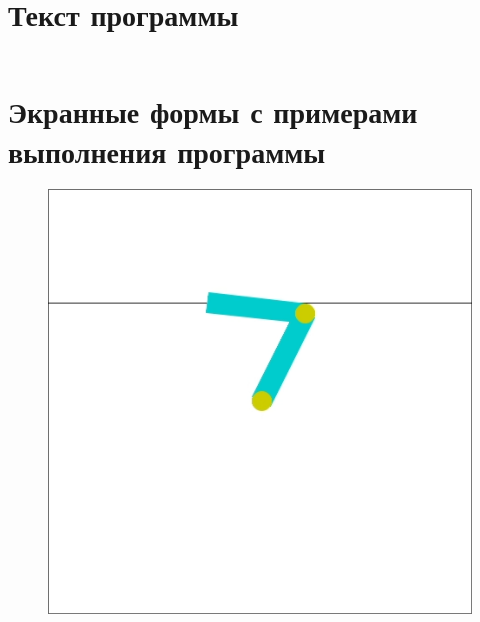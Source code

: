 \documentclass[a4paper]{article}
\begin{document}
  \section{Текст программы}
  \inputminted{python}{7.py}
  \pagebreak

  \section{Экранные формы с примерами выполнения программы}
  \begin{figure}[H]
    \centering
    \includegraphics[scale=0.6]{71}
  \end{figure}
\end{document}
